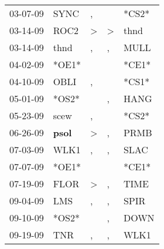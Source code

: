\begin{supertabular}{p{0.07\textwidth}p{0.06\textwidth}p{0.02\textwidth}p{0.02\textwidth}p{0.06\textwidth}}
          03-07-09\textsuperscript{} &           SYNC\textsuperscript{} &                , &                  &                            *CS2* \\
          03-14-09\textsuperscript{} &           ROC2\textsuperscript{} &     \textgreater &     \textgreater &           thnd\textsuperscript{} \\
          03-14-09\textsuperscript{} &           thnd\textsuperscript{} &                , &                , &           MULL\textsuperscript{} \\
          04-02-09\textsuperscript{} &                            *OE1* &                  &                  &                            *CE1* \\
          04-10-09\textsuperscript{} &           OBLI\textsuperscript{} &                , &                  &                            *CS1* \\
          05-01-09\textsuperscript{} &                            *OS2* &                  &                , &           HANG\textsuperscript{} \\
          05-23-09\textsuperscript{} &           scew\textsuperscript{} &                , &                  &                            *CS2* \\
          06-26-09\textsuperscript{} &  \textbf{psol\textsuperscript{}} &     \textgreater &                , &           PRMB\textsuperscript{} \\
          07-03-09\textsuperscript{} &           WLK1\textsuperscript{} &                , &                , &           SLAC\textsuperscript{} \\
          07-07-09\textsuperscript{} &                            *OE1* &                  &                  &                            *CE1* \\
          07-19-09\textsuperscript{} &           FLOR\textsuperscript{} &     \textgreater &                , &           TIME\textsuperscript{} \\
          09-04-09\textsuperscript{} &            LMS\textsuperscript{} &                , &                , &           SPIR\textsuperscript{} \\
          09-10-09\textsuperscript{} &                            *OS2* &                  &                , &           DOWN\textsuperscript{} \\
          09-19-09\textsuperscript{} &            TNR\textsuperscript{} &                , &                , &           WLK1\textsuperscript{} \\

\end{supertabular}
